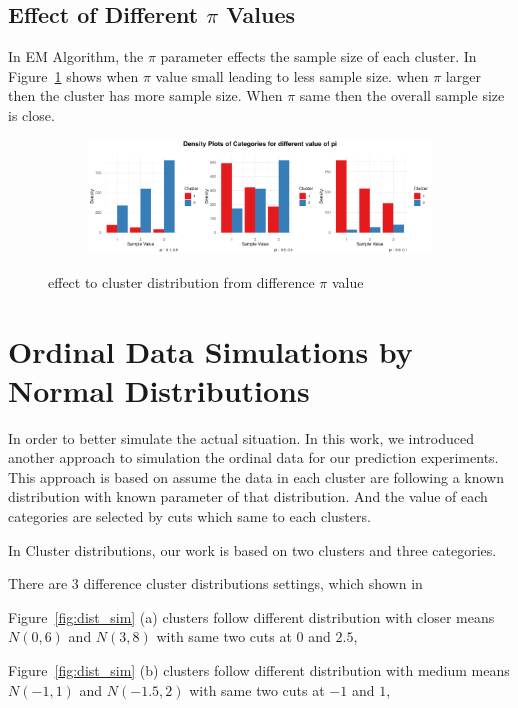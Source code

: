 \documentclass{article}
\begin{document}
\subsection{Effect of Different $\pi$ Values}
In EM Algorithm, the $\pi$ parameter effects the sample size of each cluster. 
In Figure~\ref{fig:pi} shows when $\pi$ value small leading to less sample size.
when $\pi$ larger then the cluster has more sample size.
When $\pi$ same then the overall sample size is close.
\begin{figure}[htbp!]
  \centering
  \begin{subfigure}{1.0\textwidth}
      \centering
      \includegraphics[width=\textwidth]{images/para_sim/pi.png}
  \end{subfigure}
  \caption{effect to cluster distribution from difference $\pi$ value}
  \label{fig:pi}
\end{figure}

\section{Ordinal Data Simulations by Normal Distributions}

In order to better simulate the actual situation.
In this work, we introduced another approach to simulation the ordinal data 
for our prediction experiments. 
This approach is based on assume the data in each cluster are following 
a known distribution with known parameter of that distribution.
And the value of each categories are selected by cuts which same to each clusters.

In Cluster distributions, our work is based on two clusters and three categories.

There are 3 difference cluster distributions settings, which shown in 

Figure~\ref*{fig:dist_sim} (a) clusters follow different distribution with closer means $N(0,6)$ and $N(3,8)$
with same two cuts at $0$ and $2.5$,

Figure~\ref*{fig:dist_sim} (b) clusters follow different distribution with medium means $N(-1,1)$ and $N(-1.5,2)$
with same two cuts at $-1$ and $1$,
\end{document}
